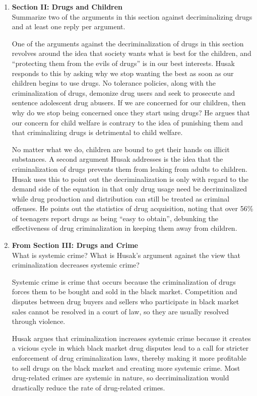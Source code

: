 \documentclass{article}
\begin{document}
\begin{enumerate}
  \item \textbf{Section II: Drugs and Children} \\
  Summarize two of the arguments in this section against decriminalizing drugs and at least one reply per argument.
  \par One of the arguments against the decriminalization of drugs in this section revolves around the idea that society wants what is best for the children, and ``protecting them from the evils of drugs'' is in our best interests. Husak responds to this by asking why we stop wanting the best as soon as our children begins to use drugs. No tolerance policies, along with the criminalization of drugs, demonize drug users and seek to prosecute and sentence adolescent drug abusers. If we are concerned for our children, then why do we stop being concerned once they start using drugs? He argues that our concern for child welfare is contrary to the idea of punishing them and that criminalizing drugs is detrimental to child welfare.
  \par No matter what we do, children are bound to get their hands on illicit substances. A second argument Husak addresses is the idea that the criminalization of drugs prevents them from leaking from adults to children. Husak uses this to point out the decriminalization is only with regard to the demand side of the equation in that only drug usage need be decriminalized while drug production and distribution can still be treated as criminal offenses. He points out the statistics of drug acquisition, noting that over 56\% of teenagers report drugs as being ``easy to obtain'', debunking the effectiveness of drug criminalization in keeping them away from children.
  \item \textbf{From Section III: Drugs and Crime} \\
  What is systemic crime? What is Husak's argument against the view that criminalization decreases systemic crime?
  \par Systemic crime is crime that occurs because the criminalization of drugs forces them to be bought and sold in the black market. Competition and disputes between drug buyers and sellers who participate in black market sales cannot be resolved in a court of law, so they are usually resolved through violence.
  \par Husak argues that criminalization increases systemic crime because it creates a vicious cycle in which black market drug disputes lead to a call for stricter enforcement of drug criminalization laws, thereby making it more profitable to sell drugs on the black market and creating more systemic crime. Most drug-related crimes are systemic in nature, so decriminalization would drastically reduce the rate of drug-related crimes.

\end{enumerate}
\end{document}
